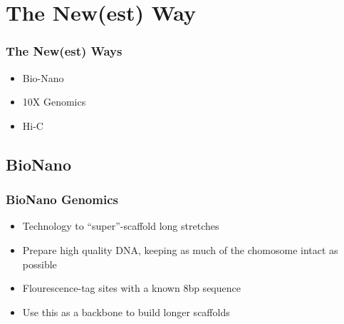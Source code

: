 \documentclass[14pt,handout]{beamer}
\begin{document}
\section{The New(est) Way}

\begin{frame}
\frametitle{The New(est) Ways}
\begin{itemize}
	\item<+-> Bio-Nano
	\item<+-> 10X Genomics
	\item<+-> Hi-C 
\end{itemize}
\end{frame}

\subsection{BioNano}

\begin{frame}
\frametitle{BioNano Genomics}
\begin{itemize}
	\item<+-> Technology to ``super''-scaffold long stretches
	\item<+-> Prepare high quality DNA, keeping as much of the chomosome intact as possible
	\item<+-> Flourescence-tag sites with a known 8bp sequence
	\item<+-> Use this as a backbone to build longer scaffolds
\end{itemize}
\end{frame}
\end{document}
